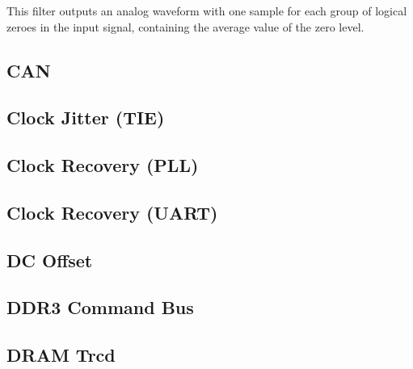 This filter outputs an analog waveform with one sample for each group of logical zeroes in the input signal, containing
the average value of the zero level.

\pagebreak
\subsection{CAN}

\pagebreak
\subsection{Clock Jitter (TIE)}

\pagebreak
\subsection{Clock Recovery (PLL)}
\label{filter:cdrpll}

\pagebreak
\subsection{Clock Recovery (UART)}

\pagebreak
\subsection{DC Offset}

\pagebreak
\subsection{DDR3 Command Bus}

\pagebreak
\subsection{DRAM Trcd}

